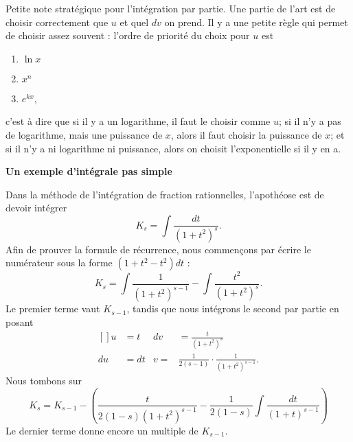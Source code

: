 Petite note stratégique pour l'intégration par partie. Une partie de l'art est de choisir correctement que $u$ et quel $dv$ on prend. Il y a une petite règle qui permet de choisir assez souvent : l'ordre de priorité du choix pour $u$ est
\let\OldTheEnumi\theenumi
\renewcommand{\theenumi}{\arabic{enumi}}
\begin{enumerate}
\item $\ln x$
\item $x^n$
\item $ e^{kx}$,
\end{enumerate}
\let\theenumi\OldTheEnumi
c'est à dire que si il y a un logarithme, il faut le choisir comme $u$; si il n'y a pas de logarithme, mais une puissance de $x$, alors il faut choisir la puissance de $x$; et si il n'y a ni logarithme ni puissance, alors on choisit l'exponentielle si il y en a.

{\bf Un exemple d'intégrale pas simple}

Dans la méthode de l'intégration de fraction rationnelles, l'apothéose est de devoir intégrer 
\begin{equation}
	K_s=\int \frac{ dt }{ (1+t^2)^s }.
\end{equation}
Afin de prouver la formule de récurrence, nous commençons par écrire le numérateur sous la forme $(1+t^2-t^2)dt$ :
\begin{equation}
	K_s=\int \frac{ 1 }{ (1+t^2)^{s-1} }-\int \frac{ t^2 }{ (1+t^2)^s }.
\end{equation}
Le premier terme vaut $K_{s-1}$, tandis que nous intégrons le second par partie en posant
\begin{equation}
	\begin{aligned}[]
		u&=t		&	dv&=\frac{ t }{ (1+t^2)^s }\\
		du&=dt		&	v=&\frac{1}{ 2(s-1) }\cdot \frac{1}{ (1+t^2)^{s-1} }.
	\end{aligned}
\end{equation}
Nous tombons sur
\begin{equation}
	K_{s}=K_{s-1}-\left( \frac{ t }{ 2(1-s)(1+t^2)^{s-1} } - \frac{1}{ 2(1-s) }\int \frac{ dt }{ (1+t)^{s-1} } \right)
\end{equation}
Le dernier terme donne encore un multiple de $K_{s-1}$.


